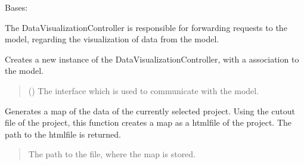\documentclass[letterpaper,10pt,english]{sphinxmanual}
\begin{document}
\begin{fulllineitems}
\label{\detokenize{apidoc/src.osm_configurator.control:src.osm_configurator.control.data_visualization_controller.DataVisualizationController}}
\pysigstartsignatures
{}
\pysigstopsignatures
\sphinxAtStartPar
Bases: 

\sphinxAtStartPar
The DataVisualizationController is responsible for forwarding requests to the model, regarding the visualization of data from the model.

\begin{fulllineitems}
\label{\detokenize{apidoc/src.osm_configurator.control:src.osm_configurator.control.data_visualization_controller.DataVisualizationController.__init__}}
\pysigstartsignatures
{}
\pysigstopsignatures
\sphinxAtStartPar
Creates a new instance of the DataVisualizationController, with a association to the model.
\begin{quote}\begin{description}
\sphinxAtStartPar
{} ({\hyperref[\detokenize{apidoc/src.osm_configurator.model.application:src.osm_configurator.model.application.application_interface.IApplication}]{}}) \textendash{} The interface which is used to communicate with the model.

\end{description}\end{quote}

\end{fulllineitems}


\begin{fulllineitems}
\label{\detokenize{apidoc/src.osm_configurator.control:src.osm_configurator.control.data_visualization_controller.DataVisualizationController.generate_cut_out_map}}
\pysigstartsignatures
{}
\pysigstopsignatures
\sphinxAtStartPar
Generates a map of the data of the currently selected project.
Using the cut\sphinxhyphen{}out file of the project, this function creates a map as a html\sphinxhyphen{}file of the project.
The path to the html\sphinxhyphen{}file is returned.
\begin{quote}\begin{description}
\sphinxAtStartPar
The path to the file, where the map is stored.


\end{description}
\end{quote}
\end{fulllineitems}
\end{fulllineitems}
\end{document}
